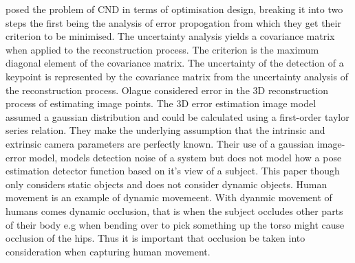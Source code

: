 \citet{olague2002optimal} posed the problem of CND in terms of optimisation design, breaking it into two steps the first being the analysis of error propogation from which they get their criterion to be minimised. The uncertainty analysis yields a covariance matrix when applied to the reconstruction process. The criterion is the maximum diagonal element of the covariance matrix. The uncertainty of the detection of a keypoint is represented by the covariance matrix from the uncertainty analysis of the reconstruction process. Olague considered error in the 3D reconstruction process of estimating image points. The 3D error estimation image model assumed a gaussian distribution and could be calculated using a first-order taylor series relation. They make the underlying assumption that the intrinsic and extrinsic camera parameters are perfectly known. 
Their use of a gaussian image-error model, models detection noise of a system but does not model how a pose estimation detector function based on it's view of a subject.
This paper though only considers static objects and does not consider dynamic objects. Human movement is an example of dynamic movemeent. With dyanmic movement of humans comes dynamic occlusion, that is when the subject occludes other parts of their body e.g when bending over to pick something up the torso might cause occlusion of the hips.
Thus it is important that occlusion be taken into consideration when capturing human movement.


